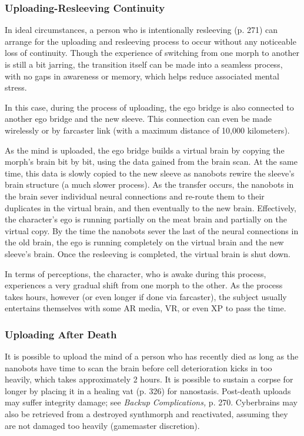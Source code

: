 \subsubsection{Uploading-Resleeving Continuity}

In ideal circumstances, a person who is intentionally 
resleeving (p. 271) can arrange for the uploading and 
resleeving process to occur without any noticeable 
loss of continuity. Though the experience of switching 
from one morph to another is still a bit jarring, the 
transition itself can be made into a seamless process, 
with no gaps in awareness or memory, which helps 
reduce associated mental stress.

In this case, during the process of uploading, the 
ego bridge is also connected to another ego bridge 
and the new sleeve. This connection can even be made 
wirelessly or by farcaster link (with a maximum distance
of 10,000 kilometers).

As the mind is uploaded, the ego bridge builds a 
virtual brain by copying the morph's brain bit by bit, 
using the data gained from the brain scan. At the same 
time, this data is slowly copied to the new sleeve as 
nanobots rewire the sleeve's brain structure (a much 
slower process). As the transfer occurs, the nanobots 
in the brain sever individual neural connections and 
re-route them to their duplicates in the virtual brain, 
and then eventually to the new brain. Effectively, the 
character's ego is running partially on the meat brain 
and partially on the virtual copy. By the time the nanobots
sever the last of the neural connections in the
old brain, the ego is running completely on the virtual 
brain and the new sleeve's brain. Once the resleeving 
is completed, the virtual brain is shut down.

In terms of perceptions, the character, who is awake 
during this process, experiences a very gradual shift 
from one morph to the other. As the process takes 
hours, however (or even longer if done via farcaster), 
the subject usually entertains themselves with some 
AR media, VR, or even XP to pass the time.

\subsubsection{Uploading After Death}

It is possible to upload the mind of a person who 
has recently died as long as the nanobots have time 
to scan the brain before cell deterioration kicks in 
too heavily, which takes approximately 2 hours. It 
is possible to sustain a corpse for longer by placing 
it in a healing vat (p. 326) for nanostasis. Post-death 
uploads may suffer integrity damage; see \textit{Backup }
\textit{Complications,} p. 270.
Cyberbrains may also be retrieved from a destroyed 
synthmorph and reactivated, assuming they are not 
damaged too heavily (gamemaster discretion).

